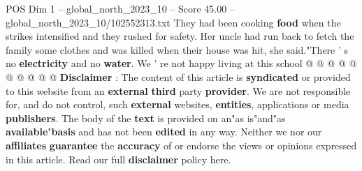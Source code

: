 \begin{textsample}{POS Dim 1 – global\_north\_2023\_10 – Score 45.00 – global\_north\_2023\_10/102552313.txt}
They had been cooking \textbf{food} when the strikes intensified and they rushed for safety.
Her uncle had run back to fetch the family some clothes and was killed when their house was hit, she said."There ' s no \textbf{electricity} and no \textbf{water}.
We ' re not happy living at this school @ @ @ @ @ @ @ @ @ @ \textbf{Disclaimer} : The content of this article is \textbf{syndicated} or provided to this website from an \textbf{external} \textbf{third} party \textbf{provider}.
We are not responsible for, and do not control, such \textbf{external} websites, \textbf{entities}, applications or media \textbf{publishers}.
The body of the \textbf{text} is provided on an"as is"and"as \textbf{available}"\textbf{basis} and has not been \textbf{edited} in any way.
Neither we nor our \textbf{affiliates} \textbf{guarantee} the \textbf{accuracy} of or endorse the views or opinions expressed in this article.
Read our full \textbf{disclaimer} policy here.

\end{textsample}

